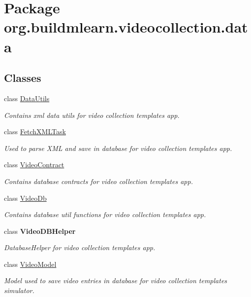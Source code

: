 \hypertarget{namespaceorg_1_1buildmlearn_1_1videocollection_1_1data}{}\section{Package org.\+buildmlearn.\+videocollection.\+data}
\label{namespaceorg_1_1buildmlearn_1_1videocollection_1_1data}
\subsection*{Classes}
\begin{DoxyCompactItemize}
\item 
class \hyperlink{classorg_1_1buildmlearn_1_1videocollection_1_1data_1_1DataUtils}{Data\+Utils}
\begin{DoxyCompactList}\small\item\em Contains xml data utils for video collection template\textquotesingle{}s app. \end{DoxyCompactList}\item 
class \hyperlink{classorg_1_1buildmlearn_1_1videocollection_1_1data_1_1FetchXMLTask}{Fetch\+X\+M\+L\+Task}
\begin{DoxyCompactList}\small\item\em Used to parse X\+ML and save in database for video collection template\textquotesingle{}s app. \end{DoxyCompactList}\item 
class \hyperlink{classorg_1_1buildmlearn_1_1videocollection_1_1data_1_1VideoContract}{Video\+Contract}
\begin{DoxyCompactList}\small\item\em Contains database contracts for video collection template\textquotesingle{}s app. \end{DoxyCompactList}\item 
class \hyperlink{classorg_1_1buildmlearn_1_1videocollection_1_1data_1_1VideoDb}{Video\+Db}
\begin{DoxyCompactList}\small\item\em Contains database util functions for video collection template\textquotesingle{}s app. \end{DoxyCompactList}\item 
class {\bfseries Video\+D\+B\+Helper}
\begin{DoxyCompactList}\small\item\em Database\+Helper for video collection template\textquotesingle{}s app. \end{DoxyCompactList}\item 
class \hyperlink{classorg_1_1buildmlearn_1_1videocollection_1_1data_1_1VideoModel}{Video\+Model}
\begin{DoxyCompactList}\small\item\em Model used to save video entries in database for video collection template\textquotesingle{}s simulator. \end{DoxyCompactList}\end{DoxyCompactItemize}
